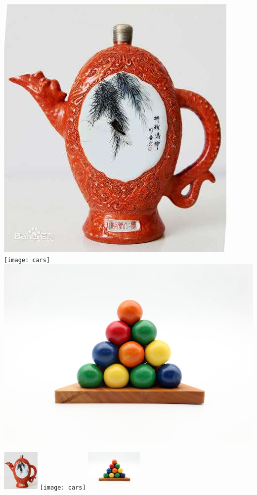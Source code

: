\documentclass{ctexart}
\begin{document}
\includegraphics[scale=0.3]{bottle}
\texttt{[image: cars]}
\includegraphics[scale=0.3]{balls}

\includegraphics[height=2cm]{bottle}
\texttt{[image: cars]}
\includegraphics[height=2cm]{balls}
\end{document}
